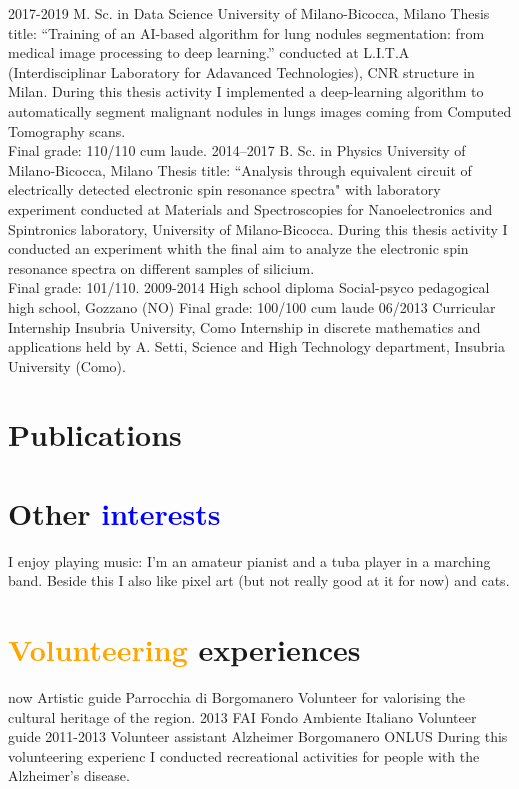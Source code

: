 \documentclass[a4paper]{friggeri-cv}
\begin{document}
\begin{entrylist}
  \entry
    {2017-2019}
    {M. Sc. in Data Science}
    {University of Milano-Bicocca, Milano}
    {Thesis title: ``Training of an AI-based algorithm for lung nodules segmentation: from medical image processing to deep learning.'' conducted at L.I.T.A (Interdisciplinar Laboratory for Adavanced Technologies), CNR structure in Milan. During this thesis activity I implemented a deep-learning algorithm to automatically segment malignant nodules in lungs images coming from Computed Tomography scans.\\
    Final grade: 110/110 cum laude.}
  \entry
    {2014–2017}
    {B. Sc. in Physics}
    {University of Milano-Bicocca, Milano}
    {Thesis title: ``Analysis through equivalent circuit of electrically detected electronic spin resonance spectra" with laboratory experiment conducted at Materials and Spectroscopies for Nanoelectronics and Spintronics laboratory, University of Milano-Bicocca. During this thesis activity I conducted an experiment whith the final aim to analyze the electronic spin resonance spectra on different samples of silicium.\\
    Final grade: 101/110. }
  \entry
    {2009-2014}
    {High school diploma}
    {Social-psyco pedagogical high school, Gozzano (NO)}
    {Final grade: 100/100 cum laude}
  \entry
    {06/2013}
    {Curricular Internship}
    {Insubria University, Como}
    {Internship in discrete mathematics and applications held by A. Setti, Science and High Technology department, Insubria University (Como).}
\end{entrylist}

\section{Publications}

\section{Other \textcolor{blue}{interests}}
I enjoy playing music: I'm an amateur pianist and a tuba player in a marching band. Beside this I also like pixel art (but not really good at it for now) and cats.
\section{\textcolor{orange}{Volunteering} experiences}
\begin{entrylist}
	\entry
	{now}
	{Artistic guide}
	{Parrocchia di Borgomanero}
	{Volunteer for valorising the cultural heritage of the region.}
	\entry
	{2013}
	{FAI}
	{Fondo Ambiente Italiano}
	{Volunteer guide}
	\entry
	{2011-2013}
	{Volunteer assistant}
	{Alzheimer Borgomanero ONLUS}
	{During this volunteering experienc I conducted recreational activities for people with the Alzheimer's disease.}
\end{entrylist}
\end{document}
